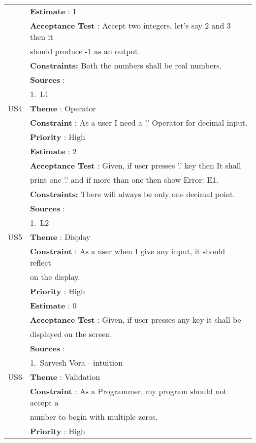\documentclass{article}
\begin{document}
\begin{longtable}{|| c || l ||}
         & \textbf{Estimate} : 1 \\
         & \textbf{Acceptance Test} : Accept two integers, let's say 2 and 3 then it \\
         & should produce -1 as an output. \\
         & \textbf{Constraints: } Both the numbers shall be real numbers.\\
         & \textbf{Sources} : \\
         & 1.~L1 \\
         \hline
         US4 & \textbf{Theme} : Operator \\
         & \textbf{Constraint} : As a user I need a '.' Operator for decimal input. \\ 
         & \textbf{Priority} : High \\
         & \textbf{Estimate} : 2 \\
         & \textbf{Acceptance Test} : Given, if user presses '.' key then It shall \\ 
         & print one '.' and if more than one then show Error: E1. \\
         & \textbf{Constraints: } There will always be only one decimal point.\\
         & \textbf{Sources} : \\
         & 1.~L2 \\
         \hline
         \newpage
         \hline
         US5 & \textbf{Theme} : Display \\
         & \textbf{Constraint} : As a user when I give any input, it should reflect \\ 
         & on the display.\\ 
         & \textbf{Priority} : High \\
         & \textbf{Estimate} : 0 \\
         & \textbf{Acceptance Test} : Given, if user presses any key it shall be \\ 
         & displayed on the screen.\\
         & \textbf{Sources} : \\
         & 1.~Sarvesh Vora - intuition \\
         \hline
         US6 & \textbf{Theme} : Validation \\
         & \textbf{Constraint} : As a Programmer, my program should not accept a \\
         & number to begin with multiple zeros. \\
         & \textbf{Priority} : High \\

\end{longtable}
\end{document}
